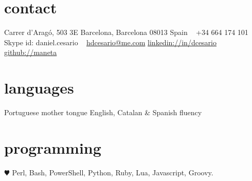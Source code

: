 \documentclass[]{friggeri-cv} %
\begin{document}


\begin{aside} %
\section{contact}
Carrer d'Aragó, 503 3E
Barcelona, Barcelona 08013
Spain
~
+34 664 174 101
Skype id: daniel.cesario
~
\href{mailto:hdcesario@me.com}{hdcesario@me.com}
\href{http://es.linkedin.com/in/dcesario/}{linkedin://in/dcesario}
\href{https://github.com/maneta}{github://maneta}
\section{languages}
Portuguese mother tongue
English, Catalan \& Spanish fluency
\section{programming}
{\color{red} $\varheartsuit$} Perl, Bash, PowerShell, Python, Ruby, Lua, Javascript, Groovy. 
\end{aside}

\end{document}
